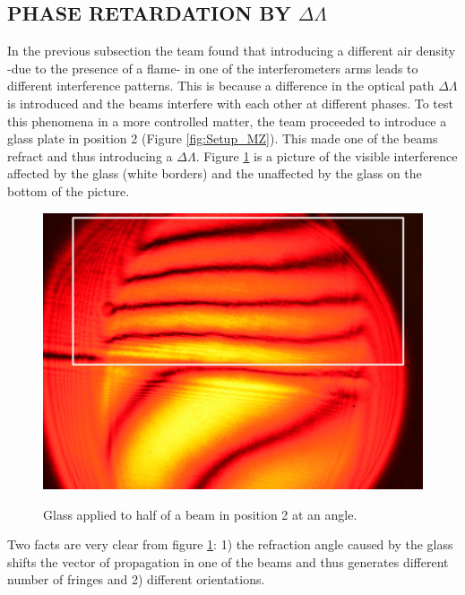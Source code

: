 \subsection{PHASE RETARDATION BY $\Delta \Lambda$}
In the previous subsection the team found that introducing a different air density -due to the presence of a flame- in one of the interferometers arms leads to different interference patterns. This is because a difference in the optical path $\Delta \Lambda$ is introduced and the beams interfere with each other at different phases. To test this phenomena in a more controlled matter, the team proceeded to introduce a glass plate in position 2 (Figure \ref{fig:Setup_MZ}). This made one of the beams refract and thus introducing a $\Delta \Lambda$. Figure \ref{fig:GlassSetup} is a picture of the visible interference affected by the glass (white borders) and the unaffected by the glass on the bottom of the picture.
\begin{figure}[H]
    \centering
    \includegraphics[scale=0.20]{Figures/Figures_I/GlassOneArm_MZ.png}
    \label{fig:GlassSetup}
    \caption{Glass applied to half of a beam in position 2 at an angle.}
\end{figure}
Two facts are very clear from figure \ref{fig:GlassSetup}: 1) the refraction angle caused by the glass shifts the vector of propagation in one of the beams and thus generates different number of fringes and 2) different orientations. 

